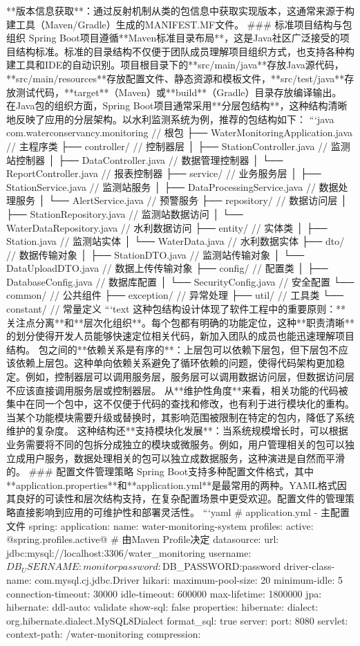 **版本信息获取**：通过反射机制从类的包信息中获取实现版本，这通常来源于构建工具（Maven/Gradle）生成的MANIFEST.MF文件。 ### 标准项目结构与包组织 Spring Boot项目遵循**Maven标准目录布局**，这是Java社区广泛接受的项目结构标准。标准的目录结构不仅便于团队成员理解项目组织方式，也支持各种构建工具和IDE的自动识别。项目根目录下的**src/main/java**存放Java源代码，**src/main/resources**存放配置文件、静态资源和模板文件，**src/test/java**存放测试代码，**target**（Maven）或**build**（Gradle）目录存放编译输出。 在Java包的组织方面，Spring Boot项目通常采用**分层包结构**，这种结构清晰地反映了应用的分层架构。以水利监测系统为例，推荐的包结构如下： ```java com.waterconservancy.monitoring // 根包 ├── WaterMonitoringApplication.java // 主程序类 ├── controller/ // 控制器层 │ ├── StationController.java // 监测站控制器 │ ├── DataController.java // 数据管理控制器 │ └── ReportController.java // 报表控制器 ├── service/ // 业务服务层 │ ├── StationService.java // 监测站服务 │ ├── DataProcessingService.java // 数据处理服务 │ └── AlertService.java // 预警服务 ├── repository/ // 数据访问层 │ ├── StationRepository.java // 监测站数据访问 │ └── WaterDataRepository.java // 水利数据访问 ├── entity/ // 实体类 │ ├── Station.java // 监测站实体 │ └── WaterData.java // 水利数据实体 ├── dto/ // 数据传输对象 │ ├── StationDTO.java // 监测站传输对象 │ └── DataUploadDTO.java // 数据上传传输对象 ├── config/ // 配置类 │ ├── DatabaseConfig.java // 数据库配置 │ └── SecurityConfig.java // 安全配置 └── common/ // 公共组件 ├── exception/ // 异常处理 ├── util/ // 工具类 └── constant/ // 常量定义 ```text 这种包结构设计体现了软件工程中的重要原则：**关注点分离**和**层次化组织**。每个包都有明确的功能定位，这种**职责清晰**的划分使得开发人员能够快速定位相关代码，新加入团队的成员也能迅速理解项目结构。 包之间的**依赖关系是有序的**：上层包可以依赖下层包，但下层包不应该依赖上层包。这种单向依赖关系避免了循环依赖的问题，使得代码架构更加稳定。例如，控制器层可以调用服务层，服务层可以调用数据访问层，但数据访问层不应该直接调用服务层或控制器层。 从**维护性角度**来看，相关功能的代码被集中在同一个包中，这不仅便于代码的查找和修改，也有利于进行模块化的重构。当某个功能模块需要升级或替换时，其影响范围被限制在特定的包内，降低了系统维护的复杂度。 这种结构还**支持模块化发展**：当系统规模增长时，可以根据业务需要将不同的包拆分成独立的模块或微服务。例如，用户管理相关的包可以独立成用户服务，数据处理相关的包可以独立成数据服务，这种演进是自然而平滑的。 ### 配置文件管理策略 Spring Boot支持多种配置文件格式，其中**application.properties**和**application.yml**是最常用的两种。YAML格式因其良好的可读性和层次结构支持，在复杂配置场景中更受欢迎。配置文件的管理策略直接影响到应用的可维护性和部署灵活性。 ```yaml # application.yml - 主配置文件 spring: application: name: water-monitoring-system profiles: active: @spring.profiles.active@ # 由Maven Profile决定 datasource: url: jdbc:mysql://localhost:3306/water_monitoring username: ${DB_USERNAME:monitor} password: ${DB_PASSWORD:password} driver-class-name: com.mysql.cj.jdbc.Driver hikari: maximum-pool-size: 20 minimum-idle: 5 connection-timeout: 30000 idle-timeout: 600000 max-lifetime: 1800000 jpa: hibernate: ddl-auto: validate show-sql: false properties: hibernate: dialect: org.hibernate.dialect.MySQL8Dialect format_sql: true server: port: 8080 servlet: context-path: /water-monitoring compression: 